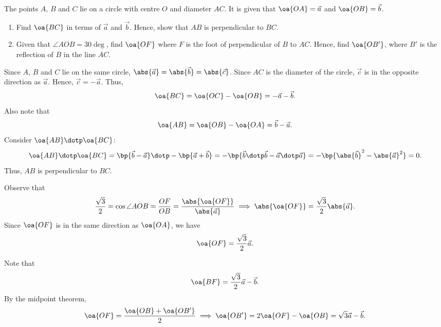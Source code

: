 \begin{problem}[\chili]
    The points $A$, $B$ and $C$ lie on a circle with centre $O$ and diameter $AC$. It is given that $\oa{OA} = \vec a$ and $\oa{OB} = \vec b$.

    \begin{enumerate}
        \item Find $\oa{BC}$ in terms of $\vec a$ and $\vec b$. Hence, show that $AB$ is perpendicular to $BC$.
        \item Given that $\angle AOB = 30\deg$, find $\oa{OF}$ where $F$ is the foot of perpendicular of $B$ to $AC$. Hence, find $\oa{OB'}$, where $B'$ is the reflection of $B$ in the line $AC$.
    \end{enumerate}
\end{problem}
\begin{solution}
    \begin{ppart}
        Since $A$, $B$ and $C$ lie on the same circle, $\abs{\vec a} = \abs{\vec b} = \abs{\vec c}$. Since $AC$ is the diameter of the circle, $\vec c$ is in the opposite direction as $\vec a$. Hence, $\vec c = -\vec a$. Thus, \[\oa{BC} = \oa{OC} - \oa{OB} = -\vec a- \vec b.\] Also note that \[\oa{AB} = \oa{OB} - \oa{OA} = \vec b - \vec a.\] Consider $\oa{AB} \dotp \oa{BC}$: \[\oa{AB} \dotp \oa{BC} = \bp{\vec b - \vec a} \dotp -\bp{\vec a + \vec b} = -\bp{\vec b \dotp \vec b - \vec a \dotp \vec a} = -\bp{\abs{\vec b}^2 - \abs{\vec a}^2} = 0.\] Thus, $AB$ is perpendicular to $BC$.
    \end{ppart}
    \begin{ppart}
        Observe that \[\frac{\sqrt3}{2} = \cos \angle AOB = \frac{OF}{OB} = \frac{\abs{\oa{OF}}}{\abs{\vec a}} \implies \abs{\oa{OF}} = \frac{\sqrt{3}}{2} \abs{\vec a}.\] Since $\oa{OF}$ is in the same direction as $\oa{OA}$, we have \[\oa{OF} = \frac{\sqrt3}{2} \vec a.\]

        Note that \[\oa{BF} = \frac{\sqrt3}2 \vec a - \vec b.\] By the midpoint theorem, \[\oa{OF} = \frac{\oa{OB} + \oa{OB'}}{2} \implies \oa{OB'} = 2\oa{OF} - \oa{OB} = \sqrt{3} \vec a - \vec b.\]
    \end{ppart}
\end{solution}